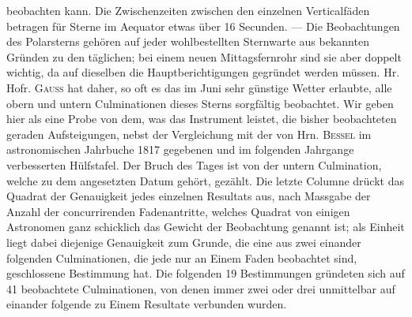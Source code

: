 beobachten kann. Die Zwischenzeiten zwischen den einzelnen Verticalfäden betragen für Sterne im
Aequator etwas über 16 Secunden. --- Die Beobachtungen des Polarsterns gehören auf jeder wohlbestellten  Sternwarte aus bekannten Gründen zu den täglichen; bei einem neuen Mittagsfernrohr sind sie
aber doppelt wichtig, da auf dieselben die Hauptberichtigungen gegründet werden müssen. Hr. Hofr.
\textsc{Gauss} hat daher, so oft es das im Juni sehr günstige Wetter erlaubte, alle obern und untern Culminationen
dieses Sterns sorgfältig beobachtet. Wir geben hier als eine Probe von dem, was das Instrument
leistet, die bisher beobachteten geraden Aufsteigungen, nebst der Vergleichung mit der von Hrn.
\textsc{Bessel} im astronomischen Jahrbuche 1817 gegebenen und im folgenden Jahrgange verbesserten Hülfstafel.
Der Bruch des Tages ist von der untern Culmination, welche zu dem angesetzten Datum gehört,
gezählt. Die letzte Columne drückt das Quadrat der Genauigkeit jedes einzelnen Resultats aus, nach
Massgabe der Anzahl der concurrirenden Fadenantritte, welches Quadrat von einigen Astronomen ganz
schicklich das Gewicht der Beobachtung genannt ist; als Einheit liegt dabei diejenige Genauigkeit zum
Grunde, die eine aus zwei einander folgenden Culminationen, die jede nur an Einem Faden beobachtet
sind, geschlossene Bestimmung hat. Die folgenden 19 Bestimmungen gründeten sich auf 41 beobachtete
Culminationen, von denen immer zwei oder drei unmittelbar auf einander folgende zu Einem Resultate
verbunden wurden.

